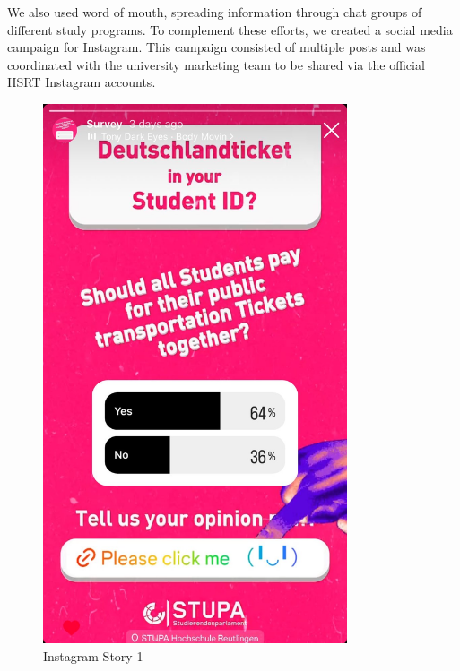 We also used word of mouth, spreading information through chat groups of different study programs. To complement these efforts, we created a social media campaign for Instagram. This campaign consisted of multiple posts and was coordinated with the university marketing team to be shared via the official HSRT Instagram accounts.

\begin{multicols}{3}
    \begin{figure}[H]
       \includegraphics[width=0.8\textwidth]{Content/Images/Story.jpeg}
      \caption{Instagram Story 1}
       \label{fig:InstagramStory1}
    \end{figure}
    \columnbreak
    \begin{figure}[H]

\end{figure}
\end{multicols}
